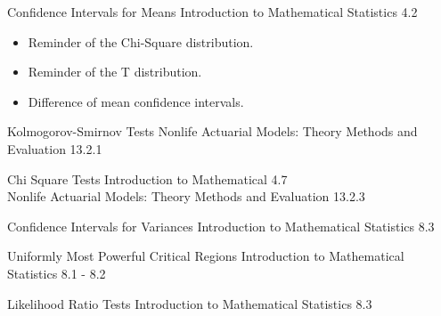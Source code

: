 \begin{CHPT_SUMM_AUTO_NUMB}[label = {L.-35}]{Confidence Intervals for Means}
Introduction to Mathematical Statistics 4.2

\tcbline

\begin{itemize}
	\item	Reminder of the Chi-Square distribution.
	\item	Reminder of the T distribution.
	\item	Difference of mean confidence intervals.
\end{itemize}
\end{CHPT_SUMM_AUTO_NUMB}

\begin{CHPT_SUMM_AUTO_NUMB}[label = {L.-36}]{Kolmogorov-Smirnov Tests}
Nonlife Actuarial Models: Theory Methods and Evaluation 13.2.1

\tcbline


\end{CHPT_SUMM_AUTO_NUMB}

\begin{CHPT_SUMM_AUTO_NUMB}[label = {L.-37}]{Chi Square Tests}
Introduction to Mathematical 4.7	\\
Nonlife Actuarial Models: Theory Methods and Evaluation 13.2.3

\tcbline


\end{CHPT_SUMM_AUTO_NUMB}

\begin{CHPT_SUMM_AUTO_NUMB}[label = {L.-38}]{Confidence Intervals for Variances}
Introduction to Mathematical Statistics 8.3

\tcbline


\end{CHPT_SUMM_AUTO_NUMB}

\begin{CHPT_SUMM_AUTO_NUMB}[label = {L.-39}]{Uniformly Most Powerful Critical Regions}
Introduction to Mathematical Statistics 8.1 - 8.2

\tcbline


\end{CHPT_SUMM_AUTO_NUMB}

\begin{CHPT_SUMM_AUTO_NUMB}[label = {L.-40}]{Likelihood Ratio Tests}
Introduction to Mathematical Statistics 8.3

\tcbline


\end{CHPT_SUMM_AUTO_NUMB}

